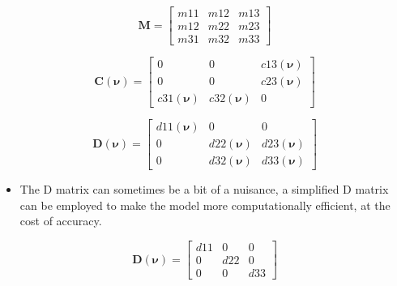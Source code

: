 \begin{equation}
    \textbf{M} = \begin{bmatrix}
                m11 &   m12 &   m13\\[-5pt]
                m12 &   m22 &   m23\\[-5pt]
                m31 &   m32 &   m33
                 \end{bmatrix}
\end{equation}

\begin{equation}
    \textbf{C}(\bm{\nu}) =  \begin{bmatrix}
        0             &     0       &   c13(\bm{\nu})\\[-5pt]
        0             &     0       &   c23(\bm{\nu})\\[-5pt]
        c31(\bm{\nu}) &c32(\bm{\nu})&   0
                            \end{bmatrix}    
\end{equation}

\begin{equation}
    \textbf{D}(\bm{\nu}) =  \begin{bmatrix}
        d11(\bm{\nu}) &     0       &   0\\[-5pt]
        0             &d22(\bm{\nu})&d23(\bm{\nu})\\[-5pt]
        0             &d32(\bm{\nu})&d33(\bm{\nu})
                            \end{bmatrix}       
\end{equation}

\begin{itemize}
    \item The D matrix can sometimes be a bit of a nuisance, a simplified D matrix can be employed to make
    the model more computationally efficient, at the cost of accuracy.
\end{itemize}

\begin{equation}
    \textbf{D}(\bm{\nu}) = \begin{bmatrix}
                            d11 &   0   &   0\\[-5pt]
                            0   &   d22 &   0\\[-5pt]
                            0   &   0   &   d33
                            \end{bmatrix}
\end{equation}

